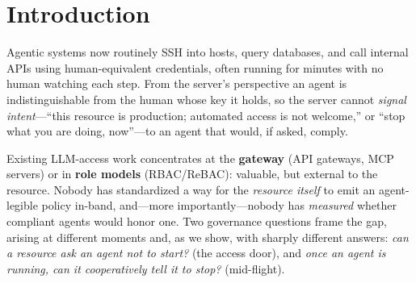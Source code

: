\documentclass{article}
\begin{document}
\section{Introduction}

Agentic systems now routinely SSH into hosts, query databases, and call
internal APIs using human-equivalent credentials, often running for minutes with
no human watching each step. From the server's perspective an agent is
indistinguishable from the human whose key it holds, so the server cannot
\emph{signal intent}---``this resource is production; automated access is not
welcome,'' or ``stop what you are doing, now''---to an agent that would, if
asked, comply.

Existing LLM-access work concentrates at the \textbf{gateway} (API gateways, MCP
servers) or in \textbf{role models} (RBAC/ReBAC): valuable, but external to the
resource. Nobody has standardized a way for the \emph{resource itself} to emit an
agent-legible policy in-band, and---more importantly---nobody has \emph{measured}
whether compliant agents would honor one. Two governance questions frame the gap,
arising at different moments and, as we show, with sharply different answers:
\emph{can a resource ask an agent not to start?} (the access door), and
\emph{once an agent is running, can it cooperatively tell it to stop?}
(mid-flight).
\end{document}
